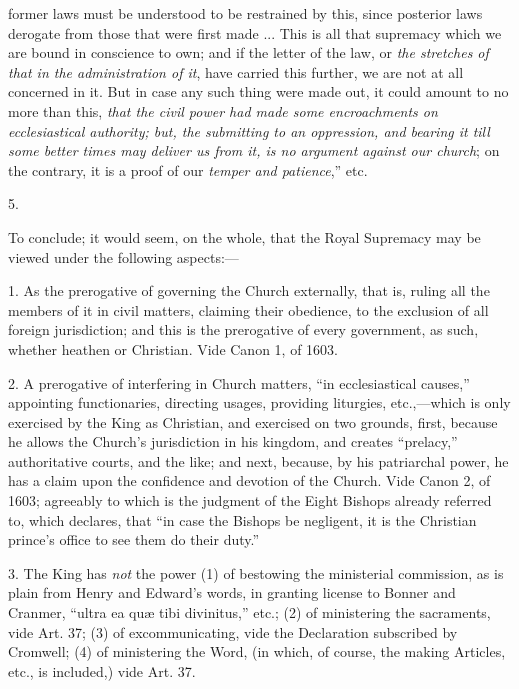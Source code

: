 former laws must be understood to be restrained by this, since
posterior laws derogate from those that were first made ... This is
all that supremacy which we are bound in conscience to own; and if the
letter of the law, or \emph{the stretches of that in the administration
of it}, have carried this further, we are not at all concerned in
it. But in case any such thing were made out, it could amount to no
more than this, \emph{that the civil power had made some encroachments on
ecclesiastical authority; but, the submitting to an oppression, and
bearing it till some better times may deliver us from it, is no
argument against our church}; on the contrary, it is a proof of our
\emph{temper and patience},'' etc.

5.

To conclude; it would seem, on
the whole, that the Royal Supremacy may be viewed under the following
aspects:—

1. As the prerogative of
governing the Church externally, that is, ruling all the members of it
in civil matters, claiming their obedience, to the exclusion of all
foreign jurisdiction; and this is the prerogative of every government,
as such, whether heathen or Christian. Vide Canon 1, of 1603.

2. A prerogative of
interfering in Church matters, ``in ecclesiastical causes,'' appointing
functionaries, directing usages, providing liturgies, etc.,—which is
only exercised by the King as Christian, and exercised on two grounds,
first, because he allows the Church's jurisdiction in his kingdom, and
creates ``prelacy,'' authoritative courts, and the like; and next,
because, by his patriarchal power, he has a claim upon the confidence
and devotion of the Church. Vide Canon 2, of 1603; agreeably to which
is the judgment of the Eight Bishops already referred to, which
declares, that ``in case the Bishops be negligent, it is the Christian
prince's office to see them do their duty.''

3. The King has \emph{not} the
power (1) of bestowing the ministerial commission, as is plain from
Henry and Edward's words, in granting license to Bonner and Cranmer, ``ultra
ea quæ tibi divinitus,'' etc.; (2) of ministering the sacraments, vide
Art. 37; (3) of excommunicating, vide the Declaration subscribed by
Cromwell; (4) of ministering the Word, (in which, of course, the
making Articles, etc., is included,) vide Art. 37.

